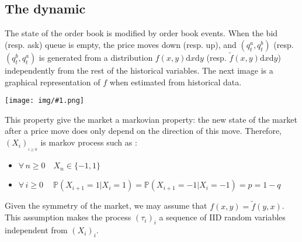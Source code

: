 \documentclass{article}
\newcommand{\IMGC}[1] {
\begin{center} \texttt{[image: img/\#1.png]} \end{center}
 }
\begin{document}
\subsection{The dynamic}

The state  of the order book is modified by order book events. When the bid (resp. ask) queue is empty, the price moves down (resp. up), and $(q_t^a, q_t^b)$ (resp.$ (q_t^b, q_t^a)$ is generated from a distribution $f(x, y) \mathrm{d}x \mathrm{d}y $ (resp. $\tilde f(x, y) \mathrm{d}x \mathrm{d}y $) independently from the rest of the historical variables.
The next image is a graphical representation of $f$ when estimated from historical data.

\IMGC{hist_f}

This property give the market a markovian property: the new state of the market after a price move does only depend on the direction of this move.
Therefore,  $(X_i)_{_{i \geq 0}}$ is markov process such as :
\begin{itemize}
\item $\forall \, n\geq0 \quad X_{n} \in \{-1,1\} $ 
\item $\forall \, i\geq0 \quad\ \mathbb{P}( X_{i+1}=1 | X_i=1 ) = \mathbb{P}( X_{i+1}=-1 | X_i=-1 ) = p = 1-q$
\end{itemize}
Given the symmetry of the market, we may assume that $f(x, y) = \tilde f(y, x)$. This assumption makes the process $(\tau_i)_i$ a sequence of IID random variables independent from $(X_i)_i$.
\end{document}
